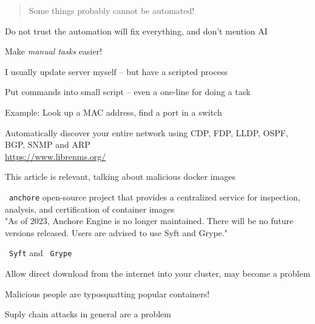 \documentclass[Screen16to9,17pt]{foils}
\begin{document}


\begin{quote}
Some things probably cannot be automated!
\end{quote}

\begin{list2}
\item Do not trust the automation will fix everything, and don't mention AI
\vskip 1cm
\item Make \emph{manual tasks} easier!
\item I usually update server myself -- but have a scripted process
\item Put commands into small script -- even a one-line for doing a task
\item Example: Look up a MAC address, find a port in a switch
\end{list2}





Automatically discover your entire network using CDP, FDP, LLDP, OSPF, BGP, SNMP and ARP \\
\url{https://www.librenms.org/}




This article is relevant, talking about malicious docker images\\


\begin{list2}
\item \faWrench\ \verb+anchore+ open-source project that provides a centralized service for inspection, analysis, and certification of container images
\\
"As of 2023, Anchore Engine is no longer maintained. There will be no future versions released. Users are advised to use Syft and Grype."
\item \faWrench\ \verb+Syft+  and \faWrench\ \verb+Grype+ 
\item Allow direct download from the internet into your cluster, may become a problem
\item Malicious people are typosquatting popular containers!
\item Suply chain attacks in general are a problem
\end{list2}
\end{document}

